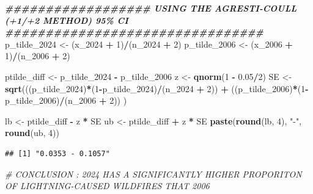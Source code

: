 \documentclass[
]{article}
\newenvironment{Shaded}{\begin{snugshade}}{\end{snugshade}}
\newcommand{\CommentTok}[1]{\textcolor[rgb]{0.56,0.35,0.01}{\textit{#1}}}
\newcommand{\DecValTok}[1]{\textcolor[rgb]{0.00,0.00,0.81}{#1}}
\newcommand{\DocumentationTok}[1]{\textcolor[rgb]{0.56,0.35,0.01}{\textbf{\textit{#1}}}}
\newcommand{\FloatTok}[1]{\textcolor[rgb]{0.00,0.00,0.81}{#1}}
\newcommand{\FunctionTok}[1]{\textcolor[rgb]{0.13,0.29,0.53}{\textbf{#1}}}
\newcommand{\NormalTok}[1]{#1}
\newcommand{\OtherTok}[1]{\textcolor[rgb]{0.56,0.35,0.01}{#1}}
\newcommand{\SpecialCharTok}[1]{\textcolor[rgb]{0.81,0.36,0.00}{\textbf{#1}}}
\newcommand{\StringTok}[1]{\textcolor[rgb]{0.31,0.60,0.02}{#1}}
\begin{document}
\begin{Shaded}
\begin{Highlighting}[]
\DocumentationTok{\#\#\#\#\#\#\#\#\#\#\#\#\#\#\#\#\#\# USING THE AGRESTI{-}COULL (+1/+2 METHOD) 95\% CI \#\#\#\#\#\#\#\#\#\#\#\#\#\#\#\#\#\#\#\#\#\#\#\#\#\#\#\#\#\#\#\#}
\NormalTok{p\_tilde\_2024 }\OtherTok{\textless{}{-}}\NormalTok{ (x\_2024 }\SpecialCharTok{+} \DecValTok{1}\NormalTok{)}\SpecialCharTok{/}\NormalTok{(n\_2024 }\SpecialCharTok{+} \DecValTok{2}\NormalTok{)}
\NormalTok{p\_tilde\_2006 }\OtherTok{\textless{}{-}}\NormalTok{ (x\_2006 }\SpecialCharTok{+} \DecValTok{1}\NormalTok{)}\SpecialCharTok{/}\NormalTok{(n\_2006 }\SpecialCharTok{+} \DecValTok{2}\NormalTok{)}

\NormalTok{ptilde\_diff }\OtherTok{\textless{}{-}}\NormalTok{ p\_tilde\_2024 }\SpecialCharTok{{-}}\NormalTok{ p\_tilde\_2006}
\NormalTok{z }\OtherTok{\textless{}{-}} \FunctionTok{qnorm}\NormalTok{(}\DecValTok{1} \SpecialCharTok{{-}} \FloatTok{0.05}\SpecialCharTok{/}\DecValTok{2}\NormalTok{)}
\NormalTok{SE }\OtherTok{\textless{}{-}} \FunctionTok{sqrt}\NormalTok{(((p\_tilde\_2024)}\SpecialCharTok{*}\NormalTok{(}\DecValTok{1}\SpecialCharTok{{-}}\NormalTok{p\_tilde\_2024)}\SpecialCharTok{/}\NormalTok{(n\_2024 }\SpecialCharTok{+} \DecValTok{2}\NormalTok{)) }\SpecialCharTok{+}
\NormalTok{            ((p\_tilde\_2006)}\SpecialCharTok{*}\NormalTok{(}\DecValTok{1}\SpecialCharTok{{-}}\NormalTok{p\_tilde\_2006)}\SpecialCharTok{/}\NormalTok{(n\_2006 }\SpecialCharTok{+} \DecValTok{2}\NormalTok{))}
\NormalTok{                )}

\NormalTok{lb }\OtherTok{\textless{}{-}}\NormalTok{ ptilde\_diff }\SpecialCharTok{{-}}\NormalTok{ z }\SpecialCharTok{*}\NormalTok{ SE}
\NormalTok{ub }\OtherTok{\textless{}{-}}\NormalTok{ ptilde\_diff }\SpecialCharTok{+}\NormalTok{ z }\SpecialCharTok{*}\NormalTok{ SE}
\FunctionTok{paste}\NormalTok{(}\FunctionTok{round}\NormalTok{(lb, }\DecValTok{4}\NormalTok{), }\StringTok{"{-}"}\NormalTok{, }\FunctionTok{round}\NormalTok{(ub, }\DecValTok{4}\NormalTok{))}
\end{Highlighting}
\end{Shaded}

\begin{verbatim}
## [1] "0.0353 - 0.1057"
\end{verbatim}

\begin{Shaded}
\begin{Highlighting}[]
\CommentTok{\# CONCLUSION : 2024 HAS A SIGNIFICANTLY HIGHER PROPORITON OF LIGHTNING{-}CAUSED WILDFIRES THAT 2006}
\end{Highlighting}
\end{Shaded}
\end{document}
